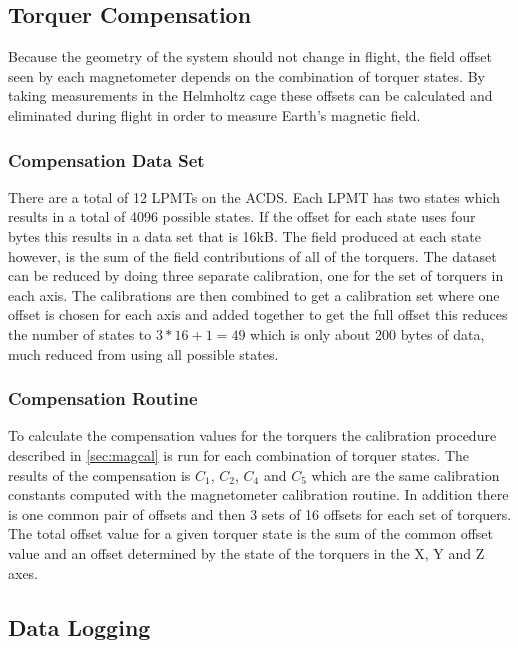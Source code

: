 \subsection{Torquer Compensation}

Because the geometry of the system should not change in flight, the field offset seen by each magnetometer depends on the combination of torquer states. By taking measurements in the Helmholtz cage these offsets can be calculated and eliminated during flight in order to measure Earth's magnetic field.

\subsubsection{Compensation Data Set}

\label{sec:comp-dat-set}

There are a total of 12 \acp{LPMT} on the \ac{ACDS}. Each \ac{LPMT} has two states which results in a total of 4096 possible states. If the offset for each state uses four bytes this results in a data set that is 16kB. The field produced at each state however, is the sum of the field contributions of all of the torquers. The dataset can be reduced by doing three separate calibration, one for the set of torquers in each axis. The calibrations are then combined to get a calibration set where one offset is chosen for each axis and added together to get the full offset this reduces the number of states to $3*16 + 1 = 49$ which is only about 200 bytes of data, much reduced from using all possible states.

\subsubsection{Compensation Routine}

\label{sec:tq-comp}

To calculate the compensation values for the torquers the calibration procedure described in \cref{sec:magcal} is run for each combination of torquer states. The results of the compensation is $C_1$, $C_2$, $C_4$ and $ C_5$ which are the same calibration constants computed with the magnetometer calibration routine. In addition there is one common pair of offsets and then 3 sets of 16 offsets for each set of torquers. The total offset value for a given torquer state is the sum of the common offset value and an offset determined by the state of the torquers in the X, Y and Z axes.

\subsection{Data Logging}

